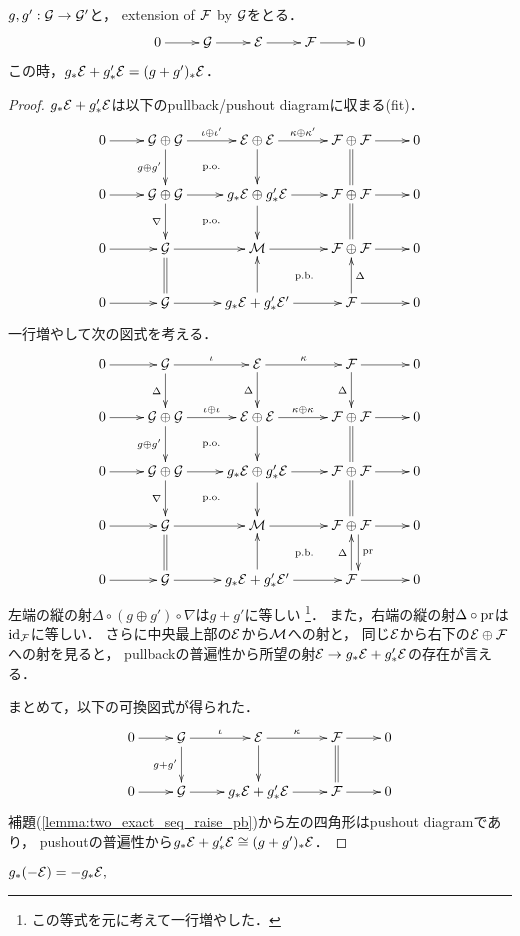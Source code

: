 \documentclass[a4paper]{jsarticle}
\makeatletter
\newcommand{\centerpb}{\ar@{}[lu]|{\text{p.b.}}}
\newcommand{\centerpo}{\ar@{}[lu]|{\text{p.o.}}}
\newcommand{\diag}{\Delta}
\newcommand{\codiag}{\nabla}
\makeatother
\begin{document}
    \begin{Lemma}
        $g, g': \shG \to \shG'$と，
        extension of $\shF$ by $\shG$をとる．
        \[\xymatrix{
                0 \ar[r]& \shG \ar[r]& \shE \ar[r]& \shF \ar[r]& 0
        }\]
        この時，$g_*\shE+g'_*\shE=(g+g')_*\shE$．
    \end{Lemma}
    \begin{proof}
        $g_*\shE+g'_* \shE$は以下のpullback/pushout diagramに収まる(fit)．
        \[\vcenter{\xymatrix{
            0 \ar[r]& \shG \oplus \shG \ar[r]^-{\iota \oplus \iota'}\ar[d]_-{g \oplus g'}& \shE \oplus \shE \ar[r]^-{\kappa \oplus \kappa'}\ar[d]& \shF \oplus \shF \ar[r]\ar@{=}[d]& 0\\
            0 \ar[r]& \shG \oplus \shG \ar[r]\ar[d]_-{\codiag}& g_*\shE \oplus g'_*\shE \ar[r]\ar[d]\centerpo& \shF \oplus \shF \ar[r]\ar@{=}[d]& 0\\
            0 \ar[r]& \shG \ar[r]& \shM \ar[r]\centerpo& \shF \oplus \shF\ar[r]& 0\\
            0 \ar[r]& \shG \ar[r]\ar@{=}[u]& g_*\shE+g'_*\shE' \ar[r]\ar[u]& \shF \ar[r]\ar[u]_-{\diag}\centerpb& 0 \\
        }}\]
        一行増やして次の図式を考える．
        \[\vcenter{\xymatrix{
                    0 \ar[r]& \shG \ar[r]^-{\iota}\ar[d]_-{\diag}& \shE \ar[r]^-{\kappa}\ar[d]_-{\diag}& \shF \ar[r]\ar[d]_-{\diag}& 0\\
            0 \ar[r]& \shG \oplus \shG \ar[r]^-{\iota \oplus \iota}\ar[d]_-{g \oplus g'}& \shE \oplus \shE \ar[r]^-{\kappa \oplus \kappa}\ar[d]& \shF \oplus \shF \ar[r]\ar@{=}[d]& 0\\
            0 \ar[r]& \shG \oplus \shG \ar[r]\ar[d]_-{\codiag}& g_*\shE \oplus g'_*\shE \ar[r]\ar[d]\centerpo& \shF \oplus \shF \ar[r]\ar@{=}[d]& 0\\
            0 \ar[r]& \shG \ar[r]& \shM \ar[r]\centerpo& \shF \oplus \shF\ar[r]\ar@<5pt>[d]^-{\pr}& 0\\
            0 \ar[r]& \shG \ar[r]\ar@{=}[u]& g_*\shE+g'_*\shE' \ar[r]\ar[u]& \shF \ar[r]\ar[u]^-{\diag}\centerpb& 0 \\
        }}\]
        左端の縦の射$\diag \circ ( g \oplus g') \circ \codiag$は$g+g'$に等しい
        \footnote{ この等式を元に考えて一行増やした． }．
        また，右端の縦の射$\diag \circ \pr$は$\id[\shF]$に等しい．
        さらに中央最上部の$\shE$から$\shM$への射と，
        同じ$\shE$から右下の$\shE \oplus \shF$への射を見ると，
        pullbackの普遍性から所望の射$\shE \to g_*\shE+g'_*\shE$の存在が言える．
        
        まとめて，以下の可換図式が得られた．
        \[\vcenter{\xymatrix{
            0 \ar[r]& \shG \ar[d]_-{g+g'}\ar[r]^-{\iota}& \shE \ar[d]\ar[r]^-{\kappa}& \shF \ar@{=}[d]\ar[r]& 0 \\
            0 \ar[r]& \shG \ar[r]& g_*\shE+g'_*\shE \ar[r]& \shF \ar[r]& 0
        }}\]
        補題(\ref{lemma:two_exact_seq_raise_pb})から左の四角形はpushout diagramであり，
        pushoutの普遍性から$g_*\shE+g'_*\shE \iso (g+g')_* \shE$．
    \end{proof}
    $g_*(-\shE)=-g_*\shE, $
\end{document}

